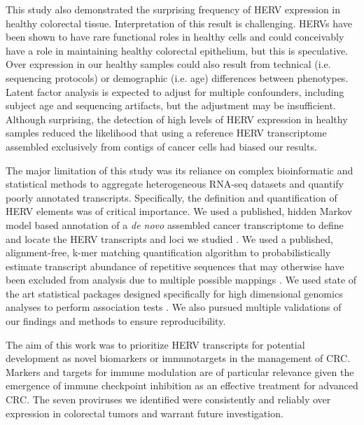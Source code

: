 This study also demonstrated the surprising frequency of HERV expression in healthy colorectal tissue.
Interpretation of this result is challenging.
HERVs have been shown to have rare functional roles in healthy cells \citep{Rote2004} and could conceivably have a role in maintaining healthy colorectal epithelium, but this is speculative.
Over expression in our healthy samples could also result from technical (i.e. sequencing protocols) or demographic (i.e. age) differences between phenotypes.
Latent factor analysis is expected to adjust for multiple confounders, including subject age and sequencing artifacts, but the adjustment may be insufficient.
Although surprising, the detection of high levels of HERV expression in healthy samples reduced the likelihood that using a reference HERV transcriptome assembled exclusively from contigs of cancer cells had biased our results.

The major limitation of this study was its reliance on complex bioinformatic and statistical methods to aggregate heterogeneous RNA-seq datasets and quantify poorly annotated transcripts.
Specifically, the definition and quantification of HERV elements was of critical importance.
We used a published, hidden Markov model based annotation of a \emph{de novo} assembled cancer transcriptome to define and locate the HERV transcripts and loci we studied \citep{Attig2019}.
We used a published, alignment-free, k-mer matching quantification algorithm to probabilistically estimate transcript abundance of repetitive sequences that may otherwise have been excluded from analysis due to multiple possible mappings \citep{Patro2017}.
We used state of the art statistical packages designed specifically for high dimensional genomics analyses to perform association tests \citep{Love2014, sva}.
We also pursued multiple validations of our findings and methods to ensure reproducibility.

The aim of this work was to prioritize HERV transcripts for potential development as novel biomarkers or immunotargets in the management of CRC.
Markers and targets for immune modulation are of particular relevance given the emergence of immune checkpoint inhibition as an effective treatment for advanced CRC.
The seven proviruses we identified were consistently and reliably over expression in colorectal tumors and warrant future investigation.
